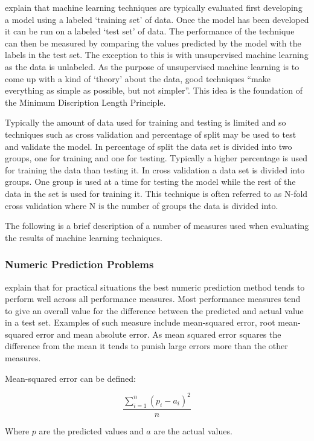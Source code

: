 \cite{witten2005data} explain that machine learning techniques are typically evaluated first developing a model using a labeled `training set' of data. Once the model has been developed it can be run on a labeled `test set' of data. The performance of the technique can then be measured by comparing the values predicted by the model with the labels in the test set. The exception to this is with unsupervised machine learning as the data is unlabeled. As the purpose of unsupervised machine learning is to come up with a kind of `theory' about the data, good techniques ``make everything as simple as possible, but not simpler''. This idea is the foundation of the Minimum Discription Length Principle.

Typically the amount of data used for training and testing is limited and so techniques such as cross validation and percentage of split may be used to test and validate the model. In percentage of split the data set is divided into two groups, one for training and one for testing. Typically a higher percentage is used for training the data than testing it. In cross validation a data set is divided into groups. One group is used at a time for testing the model while the rest of the data in the set is used for training it. This technique is often referred to as N-fold cross validation where N is the number of groups the data is divided into. 

The following is a brief description of a number of measures used when evaluating the results of machine learning techniques.

\subsubsection{Numeric Prediction Problems}

\cite{witten2005data} explain that for practical situations the best numeric prediction method tends to perform well across all performance measures. Most performance measures tend to give an overall value for the difference between the predicted and actual value in a test set. Examples of such measure include mean-squared error, root mean-squared error and mean absolute error. As mean squared error squares the difference from the mean it tends to punish large errors more than the other measures.

Mean-squared error can be defined:

$$\frac{\sum \limits_{i=1}^n (p_{i} - a_{i})^2}{n}$$

Where $p$ are the predicted values and $a$ are the actual values.

